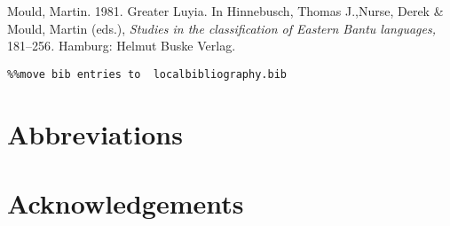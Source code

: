 \documentclass[output=paper]{langsci/langscibook}
\begin{document}
Mould, Martin. 1981. Greater Luyia. In Hinnebusch, Thomas J.,Nurse, Derek \& Mould, Martin (eds.), \textit{Studies in the classification of Eastern Bantu languages, }181–256\textit{. }Hamburg: Helmut Buske Verlag. 


\begin{verbatim}%%move bib entries to  localbibliography.bib
\end{verbatim}

\section*{Abbreviations}
\section*{Acknowledgements}

\printbibliography[heading=subbibliography,notkeyword=this]
\end{document}
